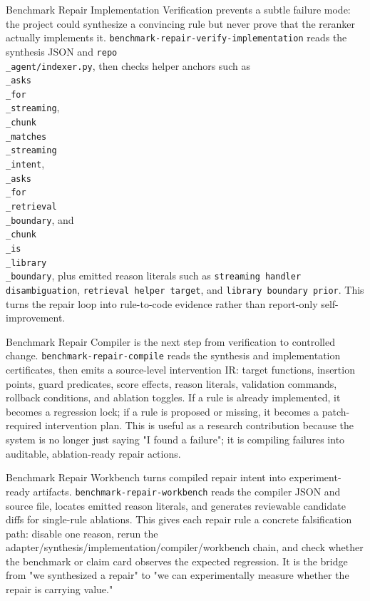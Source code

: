 \documentclass[UTF8,12pt,openany]{ctexbook}
\begin{document}
Benchmark Repair Implementation Verification prevents a subtle failure mode: the project could synthesize a convincing rule but never prove that the reranker actually implements it. \texttt{benchmark-repair-verify-implementation} reads the synthesis JSON and \texttt{repo\\_agent/indexer.py}, then checks helper anchors such as \texttt{\\_asks\\_for\\_streaming}, \texttt{\\_chunk\\_matches\\_streaming\\_intent}, \texttt{\\_asks\\_for\\_retrieval\\_boundary}, and \texttt{\\_chunk\\_is\\_library\\_boundary}, plus emitted reason literals such as \texttt{streaming handler disambiguation}, \texttt{retrieval helper target}, and \texttt{library boundary prior}. This turns the repair loop into rule-to-code evidence rather than report-only self-improvement.\par

Benchmark Repair Compiler is the next step from verification to controlled change. \texttt{benchmark-repair-compile} reads the synthesis and implementation certificates, then emits a source-level intervention IR: target functions, insertion points, guard predicates, score effects, reason literals, validation commands, rollback conditions, and ablation toggles. If a rule is already implemented, it becomes a regression lock; if a rule is proposed or missing, it becomes a patch-required intervention plan. This is useful as a research contribution because the system is no longer just saying "I found a failure"; it is compiling failures into auditable, ablation-ready repair actions.\par

Benchmark Repair Workbench turns compiled repair intent into experiment-ready artifacts. \texttt{benchmark-repair-workbench} reads the compiler JSON and source file, locates emitted reason literals, and generates reviewable candidate diffs for single-rule ablations. This gives each repair rule a concrete falsification path: disable one reason, rerun the adapter/synthesis/implementation/compiler/workbench chain, and check whether the benchmark or claim card observes the expected regression. It is the bridge from "we synthesized a repair" to "we can experimentally measure whether the repair is carrying value."\par
\end{document}
